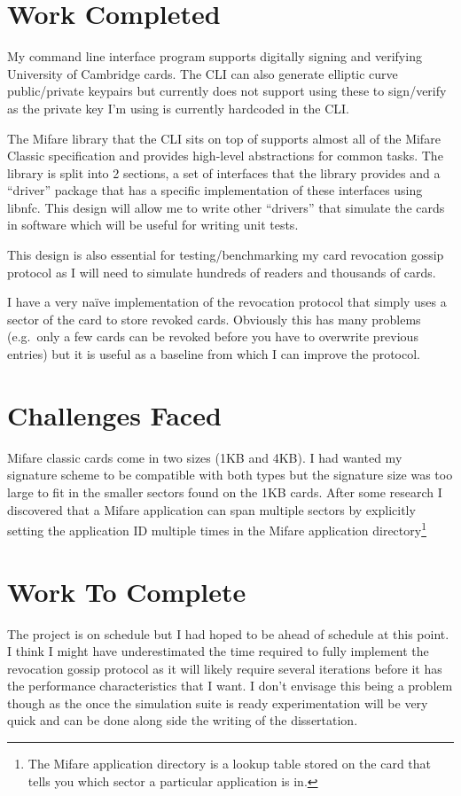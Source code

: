\documentclass[a4paper, 12pt]{article}
\begin{document}
  \section*{Work Completed}

  My command line interface program supports digitally signing and verifying University of Cambridge
  cards. The CLI can also generate elliptic curve public/private keypairs but currently does not support using these to sign/verify as the private key I'm using is currently hardcoded in the CLI.\@

  The Mifare library that the CLI sits on top of supports almost all of the Mifare Classic specification and provides high-level abstractions for common tasks. The library is split into 2 sections, a set of interfaces that the library provides and a ``driver'' package that has a specific implementation of these interfaces using libnfc. This design will allow me to write other ``drivers'' that simulate the cards in software which will be useful for writing unit tests.

  This design is also essential for testing/benchmarking my card revocation gossip protocol as I will need to simulate hundreds of readers and thousands of cards.

  I have a very naïve implementation of the revocation protocol that simply uses a sector of the card to store revoked cards. Obviously this has many problems (e.g.\ only a few cards can be revoked before you have to overwrite previous entries) but it is useful as a baseline from which I can improve the protocol.

  \section*{Challenges Faced}

  Mifare classic cards come in two sizes (1KB and 4KB). I had wanted my signature scheme to be compatible with both types but the signature size was too large to fit in the smaller sectors found on the 1KB cards. After some research I discovered that a Mifare application can span multiple sectors by explicitly setting the application ID multiple times in the Mifare application directory\footnote{The Mifare application directory is a lookup table stored on the card that tells you which sector a particular application is in.}


  \section*{Work To Complete}

  The project is on schedule but I had hoped to be ahead of schedule at this point. I think I might have underestimated the time required to fully implement the revocation gossip protocol as it will likely require several iterations before it has the performance characteristics that I want. I don't envisage this being a problem though as the once the simulation suite is ready experimentation will be very quick and can be done along side the writing of the dissertation.
\end{document}
